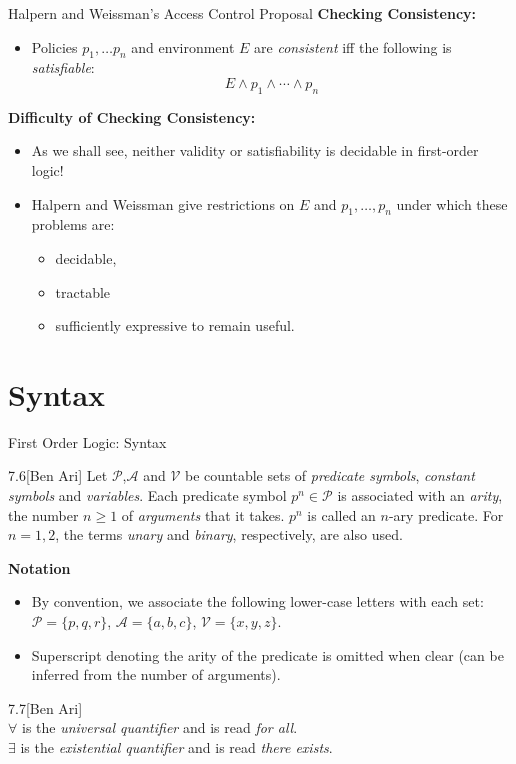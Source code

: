 \documentclass[style=sailor,size=12pt]{powerdot}
\begin{document}
\begin{wideslide}[bm=,toc=]{Halpern and Weissman's Access Control Proposal}
\textbf{Checking Consistency:}
\begin{itemize}
\item Policies $p_1,\dots p_n$ and environment $E$ are {\em consistent\/} iff
the following is {\em satisfiable\/}:
\begin{displaymath}
E\wedge p_1 \wedge \cdots \wedge p_n 
\end{displaymath}
\end{itemize}
\pause
\textbf{Difficulty of Checking Consistency:}
\begin{itemize}
\item<3-> As we shall see, neither validity or satisfiability is decidable in first-order logic!
\item<4-> Halpern and Weissman give restrictions on $E$ and $p_1,\ldots ,p_n$ under which
these problems are:
\begin{itemize}
\item<5->decidable,
\item<5->tractable
\item<5->sufficiently expressive to remain useful. 
\end{itemize}
\end{itemize}
\end{wideslide}

\section[slide=true]{Syntax}
\begin{slide}[bm=,toc=]{First Order Logic: Syntax}
\begin{defn}{7.6}[Ben Ari]
Let $\mathcal{P}$,$\mathcal{A}$ and $\mathcal{V}$ be countable sets of
\emph{predicate symbols}, \emph{constant symbols} and \emph{variables}.
Each predicate symbol $p^n \in \mathcal{P}$ is associated with an \emph{arity},
the number $n \geq 1$ of \emph{arguments} that it takes. $p^n$ is called an
$n$-ary predicate. For $n = 1,2$, the terms \emph{unary} and \emph{binary},
respectively, are also used.
\end{defn}
{\bf Notation}
\begin{itemize}
\item By convention, we associate the following lower-case letters with
each set: $\mathcal{P} = \{p,q,r\}$, $\mathcal{A} = \{a,b,c\}$, $\mathcal{V} =
\{x,y,z\}$.
\item Superscript denoting the arity of the predicate is omitted when clear (can
    be inferred from the number of arguments).

\end{itemize}
\begin{defn}{7.7}[Ben Ari]
~\\
$\forall$ is the \emph{universal quantifier} and is read \emph{for all}.\\
$\exists$ is the \emph{existential quantifier} and is read \emph{there exists}.
\end{defn}

\end{slide}
\end{document}
